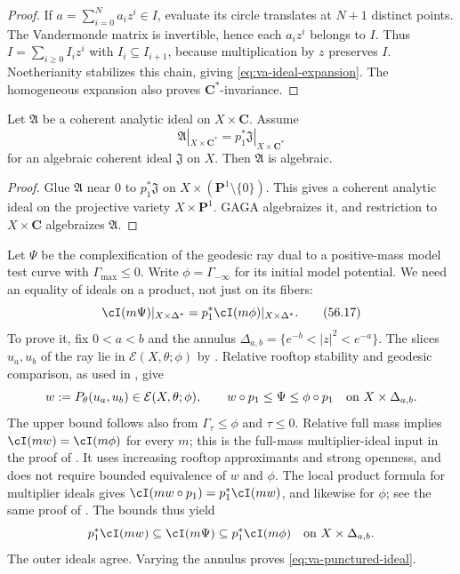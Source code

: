 \begin{proof}
If $a=\sum_{i=0}^Na_iz^i\in I$, evaluate its circle translates at
$N+1$ distinct points.
The Vandermonde matrix is invertible, hence each $a_iz^i$ belongs to
$I$.
Thus $I=\sum_{i\geq0}I_iz^i$ with $I_i\subseteq I_{i+1}$, because
multiplication by $z$ preserves $I$.
Noetherianity stabilizes this chain, giving
\eqref{eq:va-ideal-expansion}.
The homogeneous expansion also proves $\mathbf C^*$-invariance.
\end{proof}

\begin{lemma}\label{lem:va-gaga-ideal}
Let $\mathfrak A$ be a coherent analytic ideal on
$X\times\mathbf C$.
Assume
\[
 \mathfrak A|_{X\times\mathbf C^*}
       =p_1^*\mathfrak J|_{X\times\mathbf C^*}
\]
for an algebraic coherent ideal $\mathfrak J$ on $X$.
Then $\mathfrak A$ is algebraic.
\end{lemma}

\begin{proof}
Glue $\mathfrak A$ near $0$ to
$p_1^*\mathfrak J$ on
$X\times(\mathbf P^1\setminus\{0\})$.
This gives a coherent analytic ideal on the projective variety
$X\times\mathbf P^1$.
GAGA algebraizes it, and restriction to
$X\times\mathbf C$ algebraizes $\mathfrak A$.
\end{proof}

Let $\Psi$ be the complexification of the geodesic ray dual to
a positive-mass model test curve with $\Gamma_{\max}\leq0$.
Write $\phi=\Gamma_{-\infty}$ for its initial model potential.
We need an equality of ideals on a product, not just on its fibers:
\[
 \cI(m\Psi)|_{X\times\Delta^*}
       =p_1^*\cI(m\phi)|_{X\times\Delta^*}.
\tag{56.17}\label{eq:va-punctured-ideal}
\]
To prove it, fix $0<a<b$ and the annulus
$\Delta_{a,b}=\{e^{-b}<|z|^2<e^{-a}\}$.
The slices $u_a,u_b$ of the ray lie in
$\mathcal E(X,\theta;\phi)$ by .
Relative rooftop stability and geodesic comparison, as used in
, give
\[
 w:=P_\theta(u_a,u_b)\in\mathcal E(X,\theta;\phi),
 \qquad w\circ p_1\leq\Psi\leq\phi\circ p_1
                       \quad\hbox{on }X\times\Delta_{a,b}.
\]
The upper bound follows also from $\Gamma_\tau\leq\phi$ and
$\tau\leq0$. Relative full mass implies
$\cI(mw)=\cI(m\phi)$ for every $m$; this is the full-mass
multiplier-ideal input in the proof of
\cite[Proposition~3.10]{DXZ23}. It uses increasing rooftop
approximants and strong openness, and does not require bounded
equivalence of $w$ and $\phi$.
The local product formula for multiplier ideals gives
$\cI(mw\circ p_1)=p_1^*\cI(mw)$, and likewise for $\phi$;
see the same proof of \cite[Proposition~3.10]{DXZ23}.
The bounds thus yield
\[
 p_1^*\cI(mw)\subseteq\cI(m\Psi)
                      \subseteq p_1^*\cI(m\phi)
                      \quad\hbox{on }X\times\Delta_{a,b}.
\]
The outer ideals agree. Varying the annulus proves
\eqref{eq:va-punctured-ideal}.

